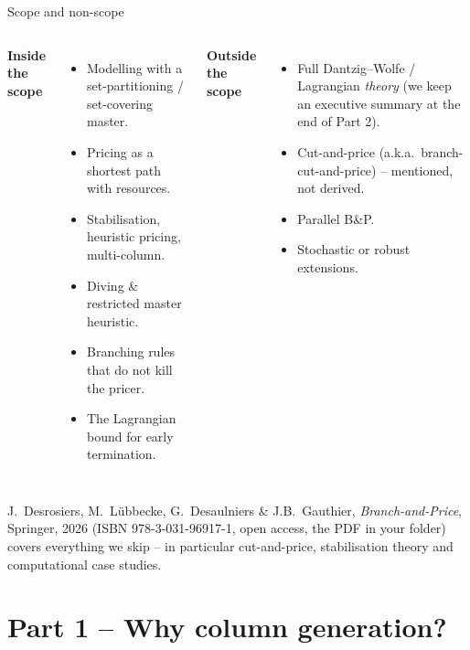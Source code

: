\documentclass[10pt,aspectratio=169]{beamer}
\begin{document}
\begin{frame}{Scope and non-scope}
  \begin{columns}[T,onlytextwidth]
    \textbf{Inside the scope}
    \begin{itemize}\small
      \item Modelling with a \alert{set-partitioning / set-covering} master.
      \item Pricing as a \alert{shortest path with resources}.
      \item Stabilisation, heuristic pricing, multi-column.
      \item Diving \& restricted master heuristic.
      \item Branching rules that do \alert{not} kill the pricer.
      \item The \alert{Lagrangian bound} for early termination.
    \end{itemize}
    \textbf{Outside the scope}
    \begin{itemize}\small
      \item Full Dantzig--Wolfe / Lagrangian \emph{theory}
            (we keep an executive summary at the end of Part 2).
      \item Cut-and-price (a.k.a.\ branch-cut-and-price) -- mentioned, not derived.
      \item Parallel B\&P.
      \item Stochastic or robust extensions.
    \end{itemize}
  \end{columns}
  \vfill
  \begin{keybox}
    J.~Desrosiers, M.~L\"ubbecke, G.~Desaulniers \& J.B.~Gauthier,
    \emph{Branch-and-Price}, Springer, 2026 (ISBN 978-3-031-96917-1, open
    access, the PDF in your folder) covers everything we skip -- in
    particular cut-and-price, stabilisation theory and computational case
    studies.
  \end{keybox}
\end{frame}

\section{Part 1 -- Why column generation?}
\end{document}
